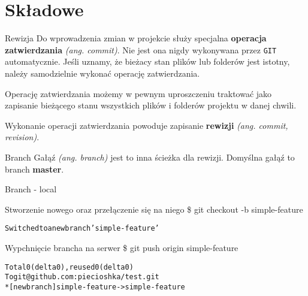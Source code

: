 \documentclass{beamer}
\begin{document}

\section{Składowe}

\begin{frame}{Rewizja}
Do wprowadzenia zmian w projekcie służy specjalna \textbf{operacja zatwierdzania} \textit{(ang. commit)}. Nie jest ona nigdy wykonywana przez \texttt{GIT} automatycznie. Jeśli uznamy, że bieżacy stan plików lub folderów jest istotny, należy samodzielnie wykonać operację zatwierdzania.

\vskip 0.5cm
Operację zatwierdzania możemy w pewnym uproszczeniu traktować jako zapisanie bieżącego stanu wszystkich plików i folderów 
projektu w danej chwili.

\vskip 0.5cm
Wykonanie operacji zatwierdzania powoduje zapisanie \textbf{rewizji} \textit{(ang. commit, revision)}.
\end{frame}

\begin{frame}{Branch}
Gałąź \textit{(ang. branch)} jest to inna ścieżka dla rewizji.
Domyślna gałąź to branch \textbf{master}.
\end{frame}

\begin{frame}{Branch - local}
\begin{block}{Stworzenie nowego oraz przełączenie się na niego}
\$ git checkout -b simple-feature
\begin{alltt}
Switched to a new branch 'simple-feature'
\end{alltt}
\end{block}
\begin{block}{Wypchnięcie brancha na serwer}
\$ git push origin simple-feature
\begin{alltt}
Total 0 (delta 0), reused 0 (delta 0) \\
To git@github.com:piecioshka/test.git \\
 * [new branch]      simple-feature -> simple-feature
\end{alltt}
\end{block}
\end{frame}
\end{document}
